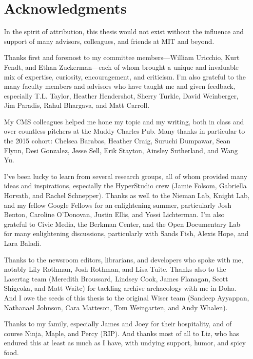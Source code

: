 % 

\cleardoublepage

\section*{Acknowledgments}

In the spirit of attribution, this thesis would not exist without the influence and support of many advisors, colleagues, and friends at MIT and beyond.

Thanks first and foremost to my committee members---William Uricchio, Kurt Fendt, and Ethan Zuckerman---each of whom brought a unique and invaluable mix of expertise, curiosity, encouragement, and criticism. I'm also grateful to the many faculty members and advisors who have taught me and given feedback, especially T.L. Taylor, Heather Hendershot, Sherry Turkle, David Weinberger, Jim Paradis, Rahul Bhargava, and Matt Carroll.

My CMS colleagues helped me hone my topic and my writing, both in class and over countless pitchers at the Muddy Charles Pub. Many thanks in particular to the 2015 cohort: Chelsea Barabas, Heather Craig, Suruchi Dumpawar, Sean Flynn, Desi Gonzalez, Jesse Sell, Erik Stayton, Ainsley Sutherland, and Wang Yu.

I've been lucky to learn from several research groups, all of whom provided many ideas and inspirations, especially the HyperStudio crew (Jamie Folsom, Gabriella Horvath, and Rachel Schnepper). Thanks as well to the Nieman Lab, Knight Lab, and my fellow Google Fellows for an enlightening summer, particularly Josh Benton, Caroline O'Donovan, Justin Ellis, and Yossi Lichterman. I'm also grateful to Civic Media, the Berkman Center, and the Open Documentary Lab for many enlightening discussions, particularly with Sands Fish, Alexis Hope, and Lara Baladi.

Thanks to the newsroom editors, librarians, and developers who spoke with me, notably Lily Rothman, Josh Rothman, and Lisa Tuite. Thanks also to the Lasertag team (Meredith Broussard, Lindsey Cook, James Flanagan, Scott Shigeoka, and Matt Waite) for tackling archive archaeology with me in Doha. And I owe the seeds of this thesis to the original Wiser team (Sandeep Ayyappan, Nathanael Johnson, Cara Matteson, Tom Weingarten, and Andy Whalen).

Thanks to my family, especially James and Joey for their hospitality, and of course Ninja, Maple, and Percy (RIP). And thanks most of all to Liz, who has endured this at least as much as I have, with undying support, humor, and spicy food.

